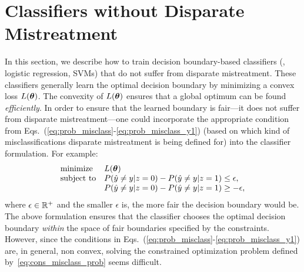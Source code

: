 \documentclass[letterpaper]{sig-alternate-2013}
\newcommand{\disc}{disparate mistreatment}
\begin{document}
\section{Classifiers without Disparate \\Mistreatment} \label{sec:methodology}
\noindent
In this section, we describe how to train decision boundary-based classifiers (\eg, logistic regression, SVMs) that do not suffer from \disc{}.
These classifiers ge\-ne\-ra\-lly learn the optimal decision boundary by minimizing a convex loss $L(\boldsymbol{\theta})$. The convexity of $L(\boldsymbol{\theta})$ ensures
that a global optimum can be found \textit{efficiently}.
In order to ensure that the learned boundary is fair---it does not suffer from \disc{}---one could incorporate the appropriate condition from Eqs.~(\ref{eq:prob_misclass}-\ref{eq:prob_misclass_y1}) (based on which kind of misclassifications \disc{} is being defined for) into the classifier formulation. For example:
\begin{equation}\label{eq:cons_misclass_prob}
	\begin{array}{ll}
		\mbox{minimize} & L(\boldsymbol{\theta}) \\
		\mbox{subject to}
			& P(\hat{y} \neq y | z = 0) - P(\hat{y} \neq y | z = 1) \leq \epsilon, \\
			& P(\hat{y} \neq y | z = 0) - P(\hat{y} \neq y | z = 1) \geq -\epsilon, \\
	\end{array}
\end{equation}
where $\epsilon \in \mathbb{R}^+$ and the smaller $\epsilon$ is, the more fair the decision boundary would be. The above formulation ensures that the classifier chooses the optimal decision boundary \textit{within} the space of fair boundaries specified by the constraints.
However, since the conditions in Eqs.~(\ref{eq:prob_misclass}-\ref{eq:prob_misclass_y1}) are, in general, non convex,
solving the constrained optimization problem defined by~\eqref{eq:cons_misclass_prob} seems difficult.
\end{document}
